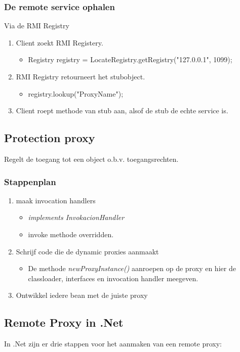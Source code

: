 \documentclass[a4paper,12pt]{article}
\begin{document}
\subsubsection{De remote service ophalen}
Via de RMI Registry
\begin{enumerate}
\item Client zoekt RMI Registery.
	\begin{itemize}
	\item Registry registry = LocateRegistry.getRegistry("127.0.0.1", 1099);
	\end{itemize}
\item RMI Registry retourneert het stubobject.
	\begin{itemize}
	\item registry.lookup("ProxyName");
	\end{itemize}
\item Client roept methode van stub aan, alsof de stub de echte service is. 
\end{enumerate}

\subsection{Protection proxy}
Regelt de toegang tot een object o.b.v. toegangsrechten.
\subsubsection{Stappenplan}
\begin{enumerate}
\item maak invocation handlers
	\begin{itemize}
	\item \textit{implements InvokacionHandler}
	\item invoke methode overridden.
	\end{itemize}
\item Schrijf code die de dynamic proxies aanmaakt
	\begin{itemize}
	\item De methode \textit{newProxyInstance()} aanroepen op de proxy en hier de classloader, interfaces en invocation handler meegeven. 
	\end{itemize}
\item Ontwikkel iedere bean met de juiste proxy
\end{enumerate}

\subsection{Remote Proxy in .Net}
In .Net zijn er drie stappen voor het aanmaken van een remote proxy:
\end{document}
